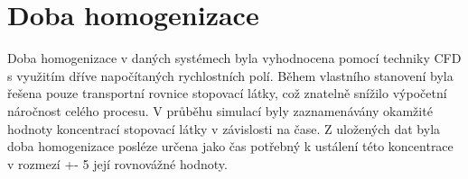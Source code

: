 \section{Doba homogenizace}
Doba homogenizace v daných systémech byla vyhodnocena pomocí techniky CFD s využitím dříve napočítaných rychlostních polí. Během vlastního stanovení byla řešena pouze transportní rovnice stopovací látky, což znatelně snížilo výpočetní náročnost celého procesu. V průběhu simulací byly zaznamenávány okamžité hodnoty koncentrací stopovací látky v závislosti na čase. Z uložených dat byla  doba homogenizace posléze určena jako čas potřebný k ustálení této koncentrace v rozmezí +- 5 její rovnovážné hodnoty.

